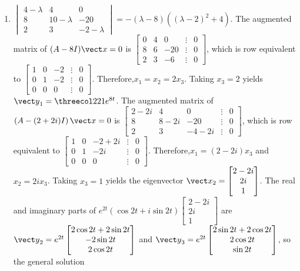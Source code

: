 \documentclass[openany]{book}
\newenvironment{sectionSolutions}{
 \begin{enumerate}[item-label={\thesection.\arabic{enumi}.}]
}{
 \end{enumerate}
}
\begin{document}
\begin{sectionSolutions}
\item
$\begin{vmatrix}4-\lambda&4&0\\8&10-\lambda&-20\\2
&3&-2-\lambda\end{vmatrix}=-(\lambda-8)\left((\lambda-2)^2+4\right)$.
 The augmented matrix of $(A-8I){\vect x=0}$ is
$\begin{bmatrix}0&4&0&\vdots&0\\8&6&-20&\vdots&0\\
2&3&-6&\vdots&0\end{bmatrix}$,
which is row equivalent to
$\begin{bmatrix} 1&0&-2&\vdots&0\\ 0&1&-2&
\vdots&0\\ 0&0&0&\vdots&0\end{bmatrix}$.
Therefore,$x_1=x_2=2x_3$. Taking $x_3=2$ yields
${\vect y}_1=\threecol221e^{8t}$.
The augmented matrix of
$\left(A-(2+2i)I\right){\vect x=0}$ is
$\begin{bmatrix}2-2i&4&0&\vdots&0\\8&
8-2i&-20&\vdots&0\\2&3&-4-2i&\vdots&0\end{bmatrix}$,
which is row equivalent to
$\begin{bmatrix} 1&0&-2+2i&\vdots&0\\
0&1&-2i&\vdots&0\\ 0&0&0&\vdots&0\end{bmatrix}$.
Therefore,$x_1=(2-2i)x_3$ and $x_2=2ix_3$.
Taking $x_3=1$ yields the eigenvector
${\vect x}_2=\begin{bmatrix}2-2i\\2i\\1\end{bmatrix}$.
The real and imaginary parts of
$e^{2t}(\cos2t+i\sin
2t)\begin{bmatrix}2-2i\\2i\\1\end{bmatrix}$
are ${\vect y}_2=e^{2t}\begin{bmatrix}2\cos2t+2\sin2t
\\-2\sin2t\\2\cos2t\end{bmatrix}$ and
${\vect y}_3=e^{2t}\begin{bmatrix}2\sin2t+2\cos2t
\\2\cos2t\\\sin2t\end{bmatrix}$, so the general solution

\end{sectionSolutions}
\end{document}
